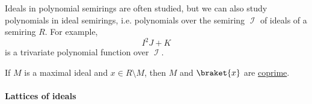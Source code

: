 \begin{example}
\begin{thmenum}
     Ideals in polynomial semirings are often studied, but we can also study polynomials in ideal semirings, i.e. polynomials over the semiring \( \mscrI \) of ideals of a semiring \( R \). For example,
    \begin{equation*}
      I^2 J + K
    \end{equation*}
    is a trivariate polynomial function over \( \mscrI \).

     If \( M \) is a maximal ideal and \( x \in R \setminus M \), then \( M \) and \( \braket{ x } \) are \hyperref[def:semiring_ideal/coprime]{coprime}.
  \end{thmenum}
\end{example}

\paragraph{Lattices of ideals}

